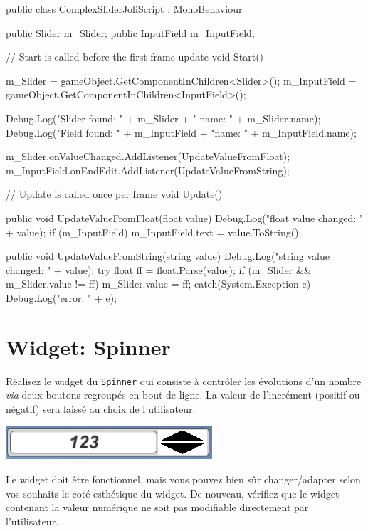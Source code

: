 \documentclass[a4paper,10pt]{article}
\newenvironment{solution}%
{\begin{tcolorbox}[breakable,colback=red!5!white,colframe=red!75!black,title=Solution]}%
{\end{tcolorbox}}
\newenvironment{boxcode}%
{\begin{tcolorbox}[breakable,colback=gray!5!white,colframe=black]}%
	{\end{tcolorbox}}
\begin{document}
\begin{solution}
\begin{boxcode}
\begin{csharpsansbord}
public class ComplexSliderJoliScript : MonoBehaviour
{	
	public Slider m_Slider;
	public InputField m_InputField;
	
	// Start is called before the first frame update
	void Start()
	{
		m_Slider = gameObject.GetComponentInChildren<Slider>();
		m_InputField = gameObject.GetComponentInChildren<InputField>();
		
		Debug.Log("Slider found: " + m_Slider  + " name: " + m_Slider.name);
		Debug.Log("Field found: " + m_InputField + "name: " + m_InputField.name);
		
		m_Slider.onValueChanged.AddListener(UpdateValueFromFloat);
		m_InputField.onEndEdit.AddListener(UpdateValueFromString);
		
	}
	
	// Update is called once per frame
	void Update() { }
	
	public void UpdateValueFromFloat(float value)
	{
		Debug.Log("float value changed: " + value);
		if (m_InputField) { m_InputField.text = value.ToString(); }
	}
	
	public void UpdateValueFromString(string value)
	{
		Debug.Log("string value changed: " + value);
		try
		{
			float ff = float.Parse(value);
			if (m_Slider && m_Slider.value != ff) { m_Slider.value = ff; }
		}
		catch(System.Exception e) {
			Debug.Log("error: " + e);
		}
	}	
}
\end{csharpsansbord}
\end{boxcode}		
\end{solution}
\fi 



\section{Widget: Spinner}

Réalisez le widget du \texttt{Spinner} qui consiste à contrôler les évolutions d'un nombre \textit{via} deux boutons regroupés en bout de ligne. La valeur de l'incrément (positif ou négatif) sera laissé au choix de l'utilisateur. 

\begin{center}
	\includegraphics[width=0.6\linewidth]{rc/ui_spinner_layout}
\end{center}

Le widget doit être fonctionnel, mais vous pouvez bien sûr changer/adapter selon vos souhaits le coté esthétique du widget.
De nouveau, vérifiez que le widget contenant la valeur numérique ne soit pas modifiable directement par l'utilisateur.
\end{document}
